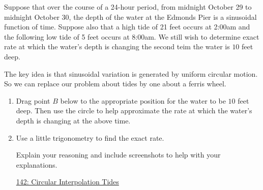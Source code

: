 \documentclass{ximera}
\begin{document}
\begin{question} \label{QPOFodfdsfreRE}

Suppose that over the course of a 24-hour period, from midnight October 29 to midnight October 30, the depth of the water at the Edmonds Pier is a sinusoidal function of time. Suppose also that a high tide of 21 feet occurs at 2:00am and the following low tide of 5 feet occurs at 8:00am. We still wish to determine exact rate at which the water's depth is changing the second teim the water is $10$ feet deep.

The key idea is that sinusoidal variation is generated by uniform circular motion. So we can replace our problem about tides by one about a ferris wheel.

\begin{enumerate}
\item Drag point $B$ below to the appropriate position for the water to be $10$ feet deep. Then use the circle to help approximate the rate at which the water's depth is changing at the above time.

\item Use a little trigonometry to find the exact rate.

Explain your reasoning and include screenshots to help with your explanations.
\begin{freeResponse}
\end{freeResponse}

\begin{onlineOnly}
    \begin{center}
\end{center}
\end{onlineOnly}

\href{https://www.desmos.com/calculator/0wxwmkzvky}{142: Circular Interpolation Tides}

\end{enumerate}
\end{question}
\end{document}

